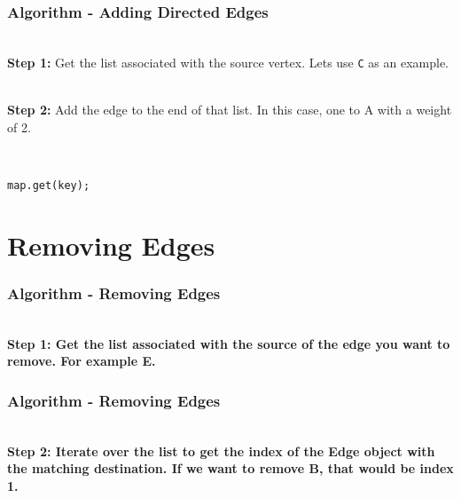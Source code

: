 \documentclass{beamer}
\begin{document}
\begin{frame}[fragile]
    \frametitle{Algorithm - Adding Directed Edges}
    \begin{minipage}{0.49\textwidth}
        \centering
        \resizebox{0.7\textwidth}{!}{
            
        }
        \vspace{0.5cm}\\
        \tiny
        \textbf{Step 1:} Get the list associated with the source vertex. Lets use \texttt{C} as an example.
    \end{minipage}
    \begin{minipage}{0.49\textwidth}
        \centering
        \resizebox{0.7\textwidth}{!}{
            
        }
        \vspace{0.5cm}\\
        \tiny
        \textbf{Step 2:} Add the edge to the end of that list. In this case, one to A with a weight of 2.
    \end{minipage}
    \vfill\\
    \hspace{4cm}
    \begin{minipage}{0.30\textwidth}
    \begin{lstlisting}[basicstyle=\tiny, frame=trBL]
map.get(key);
    \end{lstlisting}
    \end{minipage}
\end{frame}

\section{Removing Edges}

\begin{frame}[fragile]
    \frametitle{Algorithm - Removing Edges}
    \centering
    \resizebox{0.49\textwidth}{!}{
        
    }
    \vfill\\
    \textbf{Step 1: Get the list associated with the source of the edge you want to remove. For example E.}
\end{frame}

\begin{frame}[fragile]
    \frametitle{Algorithm - Removing Edges}
    \centering
    \resizebox{0.49\textwidth}{!}{
        
    }
    \vfill\\
    \textbf{Step 2: Iterate over the list to get the index of the Edge object with the matching destination. If we want to remove B, that would be index 1.}
\end{frame}
\end{document}
